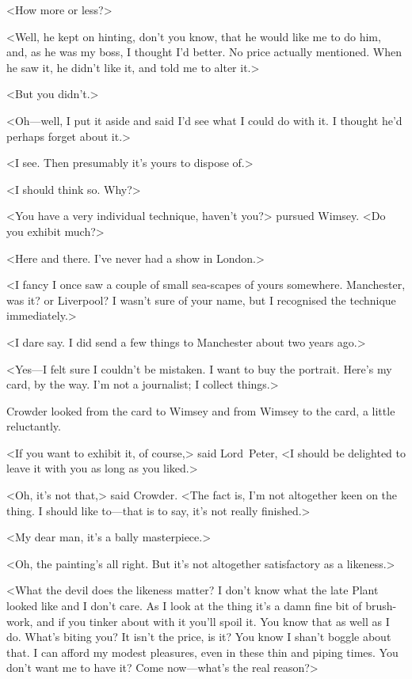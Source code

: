 <How more or less?>

<Well, he kept on hinting, don't you know, that he would like me to do him, and, as he was my boss, I thought I'd better. No price actually mentioned. When he saw it, he didn't like it, and told me to alter it.>

<But you didn't.>

<Oh—well, I put it aside and said I'd see what I could do with it. I thought he'd perhaps forget about it.>

<I see. Then presumably it's yours to dispose of.>

<I should think so. Why?>

<You have a very individual technique, haven't you?> pursued Wimsey. <Do you exhibit much?>

<Here and there. I've never had a show in London.>

<I fancy I once saw a couple of small sea-scapes of yours somewhere. Manchester, was it? or Liverpool? I wasn't sure of your name, but I recognised the technique immediately.>

<I dare say. I did send a few things to Manchester about two years ago.>

<Yes—I felt sure I couldn't be mistaken. I want to buy the portrait. Here's my card, by the way. I'm not a journalist; I collect things.>

Crowder looked from the card to Wimsey and from Wimsey to the card, a little reluctantly.

<If you want to exhibit it, of course,> said Lord~Peter, <I should be delighted to leave it with you as long as you liked.>

<Oh, it's not that,> said Crowder. <The fact is, I'm not altogether keen on the thing. I should like to—that is to say, it's not really finished.>

<My dear man, it's a bally masterpiece.>

<Oh, the painting's all right. But it's not altogether satisfactory as a likeness.>

<What the devil does the likeness matter? I don't know what the late Plant looked like and I don't care. As I look at the thing it's a damn fine bit of brush-work, and if you tinker about with it you'll spoil it. You know that as well as I do. What's biting you? It isn't the price, is it? You know I shan't boggle about that. I can afford my modest pleasures, even in these thin and piping times. You don't want me to have it? Come now—what's the real reason?>

